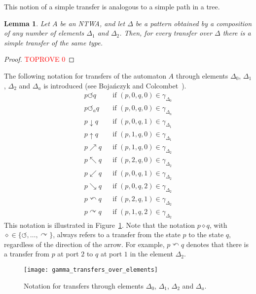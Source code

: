 \documentclass[12pt,a4paper]{article}
\newtheorem{lemma}{Lemma}
\theoremstyle{definition}
\begin{document}
This notion of a simple transfer
is analogous to a simple path in a tree.

\begin{lemma}\label{lemma_gamma_simple_path}
Let $A$ be an NTWA,
and let $\Delta$ be a pattern obtained by a composition of any number of elements $\Delta_1$ and $\Delta_2$.
Then, for every transfer over $\Delta$
there is a simple transfer of the same type.
\end{lemma}
\begin{proof}\textcolor{red}{TOPROVE 0}\end{proof}

The following notation for transfers
of the automaton $A$ through elements
$\Delta_0$, $\Delta_1$, $\Delta_2$ and $\Delta_a$
is introduced
(see Boja\'nczyk and Colcombet~\cite[Fig.~5.1]{BojanczykColcombet_reg}).
\begin{align*}
p \circlearrowleft q && \text{if } (p, 0, q, 0) \in \gamma_{\Delta_0}\\
p \circlearrowleft_a q && \text{if } (p, 0, q, 0) \in \gamma_{\Delta_a}\\
p \downarrow q && \text{if } (p, 0, q, 1) \in \gamma_{\Delta_1}\\
p \uparrow q && \text{if } (p, 1, q, 0) \in \gamma_{\Delta_1}\\
p \nearrow q && \text{if } (p, 1, q, 0) \in \gamma_{\Delta_2}\\
p \nwarrow q && \text{if } (p, 2, q, 0) \in \gamma_{\Delta_2}\\
p \swarrow q && \text{if } (p, 0, q, 1) \in \gamma_{\Delta_2}\\
p \searrow q && \text{if } (p, 0, q, 2) \in \gamma_{\Delta_2}\\
p \curvearrowleft q && \text{if } (p, 2, q, 1) \in \gamma_{\Delta_2}\\
p \curvearrowright q && \text{if } (p, 1, q, 2) \in \gamma_{\Delta_2}
\end{align*}
This notation is illustrated in Figure~\ref{f:gamma_transfers_over_elements}.
Note that the notation $p \diamond q$, with $\diamond \in \{\circlearrowleft, \ldots, \curvearrowright\}$,
always refers to a transfer from the state $p$ to the state $q$,
regardless of the direction of the arrow.
For example, $p \curvearrowleft q$ denotes that there is a transfer
from $p$ at port $2$ to $q$ at port $1$ in the element $\Delta_2$.

\begin{figure}[t]
	\centerline{\texttt{[image: gamma\_transfers\_over\_elements]}}
	\caption{Notation for transfers through elements $\Delta_0$, $\Delta_1$, $\Delta_2$ and $\Delta_a$.}
	\label{f:gamma_transfers_over_elements}
\end{figure}
\end{document}
